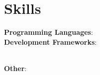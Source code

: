 \section{\textbf{Skills}}
    \begin{itemize}[leftmargin=0in, label={}]
	\small{\item{
        \textbf{Programming Languages}{: }} \\
		\textbf{Development Frameworks}{: }} \\
  \textbf{Other}{:}
    \end{itemize}
\vspace{-17pt}